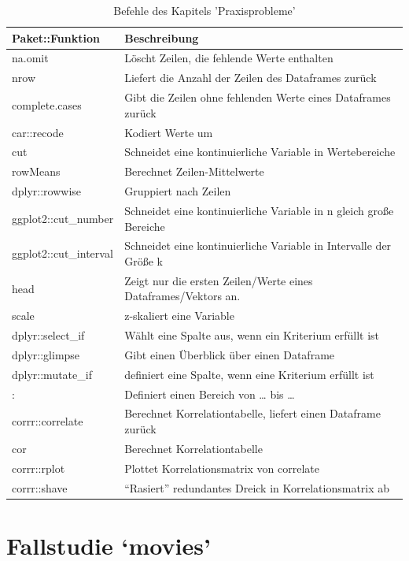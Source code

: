 \documentclass[12pt,ngerman,]{book}
\begin{document}
\begin{table}

\caption{\label{tab:befehle-praxisprobleme}Befehle des Kapitels 'Praxisprobleme'}
\centering
\begin{tabular}[t]{l|l}
\hline
Paket::Funktion & Beschreibung\\
\hline
na.omit & Löscht Zeilen, die fehlende Werte enthalten\\
\hline
nrow & Liefert die Anzahl der Zeilen des Dataframes zurück\\
\hline
complete.cases & Gibt die Zeilen ohne fehlenden Werte eines Dataframes zurück\\
\hline
car::recode & Kodiert Werte um\\
\hline
cut & Schneidet eine kontinuierliche Variable in Wertebereiche\\
\hline
rowMeans & Berechnet Zeilen-Mittelwerte\\
\hline
dplyr::rowwise & Gruppiert nach Zeilen\\
\hline
ggplot2::cut\_number & Schneidet eine kontinuierliche Variable in n gleich große Bereiche\\
\hline
ggplot2::cut\_interval & Schneidet eine kontinuierliche Variable in Intervalle der Größe k\\
\hline
head & Zeigt nur die ersten Zeilen/Werte eines Dataframes/Vektors an.\\
\hline
scale & z-skaliert eine Variable\\
\hline
dplyr::select\_if & Wählt eine Spalte aus, wenn ein Kriterium erfüllt ist\\
\hline
dplyr::glimpse & Gibt einen Überblick über einen Dataframe\\
\hline
dplyr::mutate\_if & definiert eine Spalte, wenn eine Kriterium erfüllt ist\\
\hline
: & Definiert einen Bereich von … bis …\\
\hline
corrr::correlate & Berechnet Korrelationtabelle, liefert einen Dataframe zurück\\
\hline
cor & Berechnet Korrelationtabelle\\
\hline
corrr::rplot & Plottet Korrelationsmatrix von correlate\\
\hline
corrr::shave & “Rasiert” redundantes Dreick in Korrelationsmatrix ab\\
\hline
\end{tabular}
\end{table}

\chapter{\texorpdfstring{Fallstudie
`movies'}{Fallstudie movies}}\label{case-movies}
\end{document}
